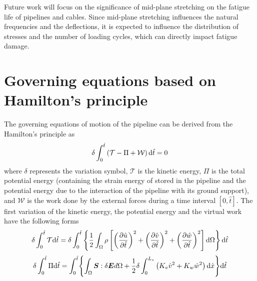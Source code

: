 \documentclass[3p,doublespacing,authoryear,11pt]{elsarticle} %
\begin{document}
Future work will focus on the significance of mid-plane stretching on the fatigue life of pipelines and cables. Since mid-plane stretching influences the natural frequencies and the deflections, it is expected to influence the distribution of stresses and the number of loading cycles, which can directly impact fatigue damage.    

\appendix 
\section{Governing equations based on Hamilton's principle} 
\label{appendix_first}

The governing equations of motion of the pipeline can be derived from the Hamilton's principle as
\begin{equation}\label{Hamilton_pple}
\delta \int_{0}^{\hat{t}}\left ( \mathcal{T} -\Pi + \mathcal{W} \right )\textup{d}\hat{t}=0  %
\end{equation}
where $\delta$ represents the variation symbol, $\mathcal{T}$ is the kinetic energy, $\Pi$ is the total potential energy (containing the strain energy of stored in the pipeline and the potential energy due to the interaction of the pipeline with its ground support), and $\mathcal{W}$ is the work done by the external forces during a time interval $\left [ 0,\hat{t} \right ]$. The first variation of the kinetic energy, the potential energy and the virtual work have the following forms
\begin{equation}\label{Eq_4_1}
\delta \int_{0}^{\hat{t} } \mathcal{T} \textup{d} \hat{t} = \delta \int_{0}^{\hat{t}}\left \{\frac{1}{2}\int_\Omega \rho \left [\left ( \frac{\partial \hat{u}}{\partial \hat{t}} \right )^2+ \left ( \frac{\partial \hat{v}}{\partial \hat{t}} \right )^2+\left ( \frac{\partial \hat{w}}{\partial \hat{t}} \right )^2 \right ]\textup{d} \Omega \right \}\textup{d}  \hat{t} 
\end{equation}
\begin{equation}\label{Eq_4_2} 
\begin{aligned}
 \delta \int_{0}^{\hat{t}}\Pi \textup{d} \hat{t} = \int_{0}^{\hat{t} }  \Biggl\{ \int_{\Omega} \boldsymbol{S}: \delta \boldsymbol{E} d\Omega + \frac{1}{2} \delta \int_{0}^{L_s}\left ( K_v \hat{v}^2  + K_w \hat{w}^2 \right )\textup{d}\hat{x} \Biggr\} \textup{d} \hat{t} 
\end{aligned}
\end{equation}
\end{document}
